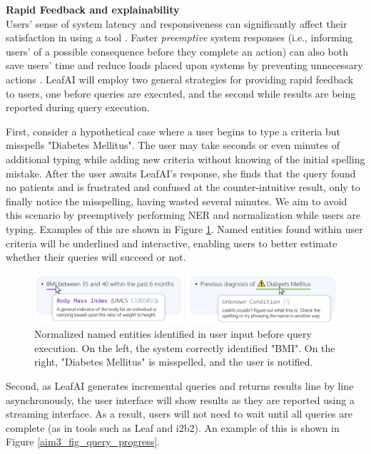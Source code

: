 \documentclass[../main.tex]{subfiles}
\begin{document}
\noindent \textbf{Rapid Feedback and explainability} \\
Users' sense of system latency and responsiveness can significantly affect their satisfaction in using a tool \cite{li2019effects, arapakis2014impact, shneiderman1984response}. Faster \textit{preemptive} system responses (i.e., informing users' of a possible consequence before they complete an action) can also both save users' time and reduce loads placed upon systems by preventing unnecessary actions \cite{lempel2003predictive, diaz2016search}. LeafAI will employ two general strategies for providing rapid feedback to users, one before queries are executed, and the second while results are being reported during query execution.

First, consider a hypothetical case where a user begins to type a criteria but misspells "Diabetes Mellitus". The user may take seconds or even minutes of additional typing while adding new criteria without knowing of the initial spelling mistake. After the user awaits LeafAI's response, she finds that the query found no patients and is frustrated and confused at the counter-intuitive result, only to finally notice the misspelling, having wasted several minutes. We aim to avoid this scenario by preemptively performing NER and normalization while users are typing. Examples of this are shown in Figure \ref{aim3_fig_mouse_hover}. Named entities found within user criteria will be underlined and interactive, enabling users to better estimate whether their queries will succeed or not.

\begin{figure}[h!]
  \centering
  \includegraphics[scale=0.68]{Figures/Aim3/aim3_mouse_hover.pdf}  
  \caption{Normalized named entities identified in user input before query execution. On the left, the system correctly identified "BMI". On the right, "Diabetes Mellitus" is misspelled, and the user is notified.}
\label{aim3_fig_mouse_hover}
\end{figure}

Second, as LeafAI generates incremental queries and returns results line by line asynchronously, the user interface will show results as they are reported using a streaming interface. As a result, users will not need to wait until all queries are complete (as in tools such as Leaf and i2b2). An example of this is shown in Figure \ref{aim3_fig_query_progress}.
\end{document}
